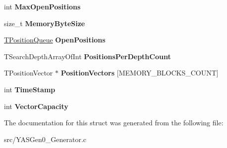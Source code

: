 \begin{DoxyCompactItemize}
int {\bfseries Max\+Open\+Positions}
\item 
\mbox{\label{struct_t_positions_a24d0416534c3d2802dcd63d5a3a22884}} 
size\+\_\+t {\bfseries Memory\+Byte\+Size}
\item 
\mbox{\label{struct_t_positions_a125222c906c1c327799d9d71c2603082}} 
\hyperlink{struct_t_position_queue}{T\+Position\+Queue} {\bfseries Open\+Positions}
\item 
\mbox{\label{struct_t_positions_ab34d9bac45ff492e8ffe202c383b27f6}} 
T\+Search\+Depth\+Array\+Of\+Int {\bfseries Positions\+Per\+Depth\+Count}
\item 
\mbox{\label{struct_t_positions_a64fe12e0c38cfba72087c99808d71fcd}} 
T\+Position\+Vector $\ast$ {\bfseries Position\+Vectors} \mbox{[}M\+E\+M\+O\+R\+Y\+\_\+\+B\+L\+O\+C\+K\+S\+\_\+\+C\+O\+U\+NT\mbox{]}
\item 
\mbox{\label{struct_t_positions_a987bc2bee982996aa699f3071e005328}} 
int {\bfseries Time\+Stamp}
\item 
\mbox{\label{struct_t_positions_a7cf51258df0f1c1002dde802e4359784}} 
int {\bfseries Vector\+Capacity}
\end{DoxyCompactItemize}


The documentation for this struct was generated from the following file\+:\begin{DoxyCompactItemize}
\item 
src/Y\+A\+S\+Gen0\+\_\+\+Generator.\+c\end{DoxyCompactItemize}
